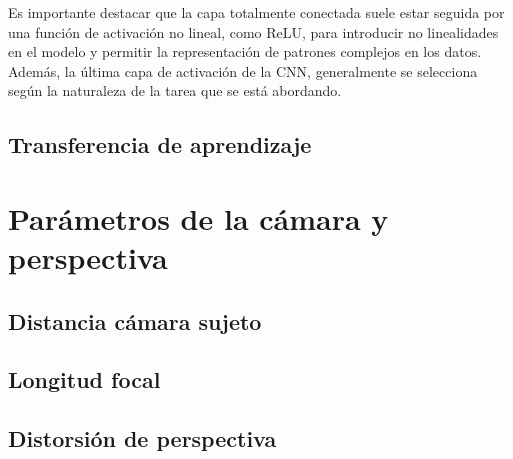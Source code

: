 Es importante destacar que la capa totalmente conectada suele estar seguida por una función de activación no lineal, como ReLU, para introducir no linealidades en el modelo y permitir la representación de patrones complejos en los datos. Además, la última capa de activación de la CNN, generalmente se selecciona según la naturaleza de la tarea que se está abordando.

\subsection{Transferencia de aprendizaje}

\section{Parámetros de la cámara y perspectiva}
	
\subsection*{Distancia cámara sujeto}

\subsection*{Longitud focal}
	
\subsection*{Distorsión de perspectiva}

